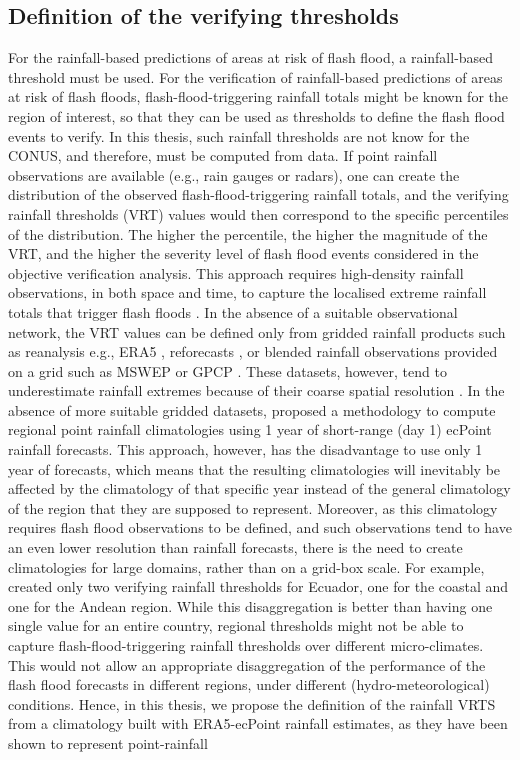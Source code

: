 \subsection{Definition of the verifying thresholds}
\label{verifying_rainfall_threshold}
For the rainfall-based predictions of areas at risk of flash flood, a rainfall-based threshold must be used. For the verification of rainfall-based predictions of areas at risk of flash floods, flash-flood-triggering rainfall totals might be known for the region of interest, so that they can be used as thresholds to define the flash flood events to verify. In this thesis, such rainfall thresholds are not know for the CONUS, and therefore, must be computed from data. If point rainfall observations are available (e.g., rain gauges or radars), one can create the distribution of the observed flash-flood-triggering rainfall totals, and the verifying rainfall thresholds (VRT) values would then correspond to the specific percentiles of the distribution. The higher the percentile, the higher the magnitude of the VRT, and the higher the severity level of flash flood events considered in the objective verification analysis. This approach requires high-density rainfall observations, in both space and time, to capture the localised extreme rainfall totals that trigger flash floods \citep{Haiden_2016, RamosFilho_2021}. In the absence of a suitable observational network, the VRT values can be defined only from gridded rainfall products such as reanalysis e.g., ERA5 \citep{Hersbach_2020}, reforecasts \citep{Hamill_2006b}, or blended rainfall observations provided on a grid such as MSWEP \citep{Beck_2019} or GPCP \citep{Adler_2018}. These datasets, however, tend to underestimate rainfall extremes because of their coarse spatial resolution \citep{Tapiador_2019}. In the absence of more suitable gridded datasets, \citet{Pillosu_2024} proposed a methodology to compute regional point rainfall climatologies using 1 year of short-range (day 1) ecPoint rainfall forecasts. This approach, however, has the disadvantage to use only 1 year of forecasts, which means that the resulting climatologies will inevitably be affected by the climatology of that specific year instead of the general climatology of the region that they are supposed to represent. Moreover, as this climatology requires flash flood observations to be defined, and such observations tend to have an even lower resolution than rainfall forecasts, there is the need to create climatologies for large domains, rather than on a grid-box scale. For example, \citet{Pillosu_2024} created only two verifying rainfall thresholds for Ecuador, one for the coastal and one for the Andean region. While this disaggregation is better than having one single value for an entire country, regional thresholds might not be able to capture flash-flood-triggering rainfall thresholds over different micro-climates. This would not allow an appropriate disaggregation of the performance of the flash flood forecasts in different regions, under different (hydro-meteorological) conditions. Hence, in this thesis, we propose the definition of the rainfall VRTS from a climatology built with ERA5-ecPoint rainfall estimates, as they have been shown to represent point-rainfall 